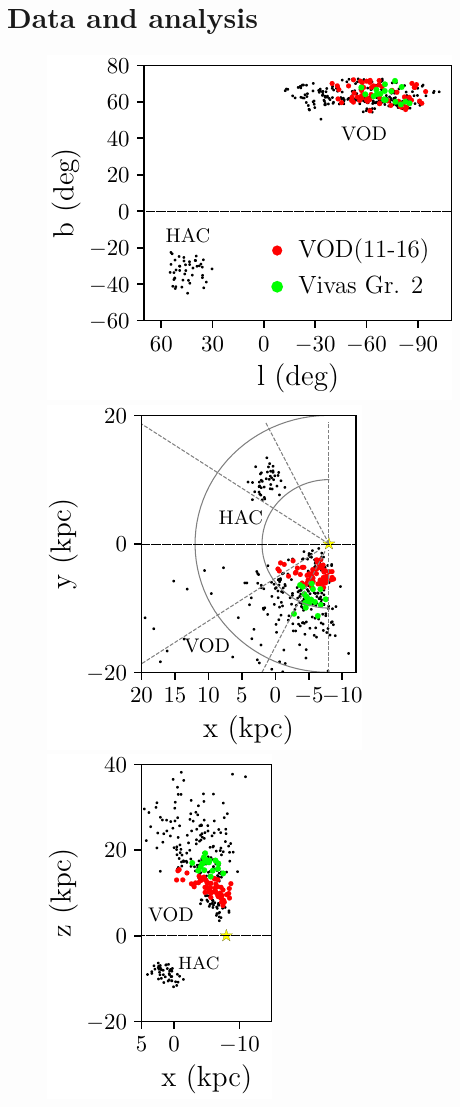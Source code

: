 \documentclass[fleqn,usenatbib]{mnras}
\begin{document}
\section{Data and analysis}
%
\begin{figure}
	\includegraphics[scale=0.518]{lb.pdf}
	\includegraphics[scale=0.518]{xy.pdf}
	\includegraphics[scale=0.518]{xz.pdf}

\end{figure}
\end{document}
